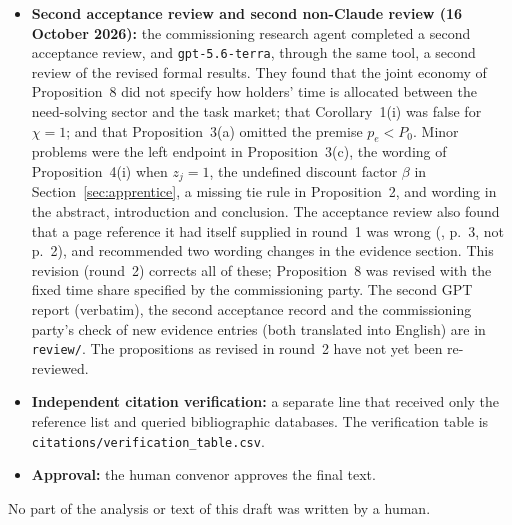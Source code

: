 \documentclass[12pt]{article}
\theoremstyle{remark}
\begin{document}
\begin{itemize}[itemsep=1pt]
\item \textbf{Second acceptance review and second non-Claude review (16 October 2026):} the commissioning research agent completed a second acceptance review, and \texttt{gpt-5.6-terra}, through the same tool, a second review of the revised formal results. They found that the joint economy of Proposition~8 did not specify how holders' time is allocated between the need-solving sector and the task market; that Corollary~1(i) was false for $\chi=1$; and that Proposition~3(a) omitted the premise $p_e<P_0$. Minor problems were the left endpoint in Proposition~3(c), the wording of Proposition~4(i) when $z_j=1$, the undefined discount factor $\beta$ in Section~\ref{sec:apprentice}, a missing tie rule in Proposition~2, and wording in the abstract, introduction and conclusion. The acceptance review also found that a page reference it had itself supplied in round~1 was wrong (\citealp{korom2025penda}, p.~3, not p.~2), and recommended two wording changes in the evidence section. This revision (round~2) corrects all of these; Proposition~8 was revised with the fixed time share specified by the commissioning party. The second GPT report (verbatim), the second acceptance record and the commissioning party's check of new evidence entries (both translated into English) are in \texttt{review/}. The propositions as revised in round~2 have not yet been re-reviewed.
\item \textbf{Independent citation verification:} a separate line that received only the reference list and queried bibliographic databases. The verification table is \texttt{citations/verification\_table.csv}.
\item \textbf{Approval:} the human convenor approves the final text.
\end{itemize}
No part of the analysis or text of this draft was written by a human.



\end{document}
